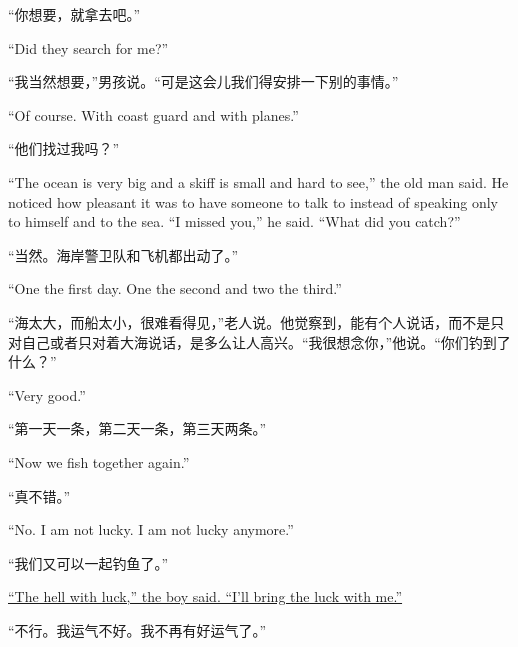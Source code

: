 \begin{paracol}{2}
\switchcolumn

“你想要，就拿去吧。”

\switchcolumn*

``Did they search for me?''

\switchcolumn

“我当然想要，”男孩说。“可是这会儿我们得安排一下别的事情。”

\switchcolumn*

``Of course. With coast guard and with planes.''

\switchcolumn

“他们找过我吗？”

\switchcolumn*

``The ocean is very big and a skiff is small and hard to see,'' the old man
said. He noticed how pleasant it was to have someone to talk to instead of
speaking only to himself and to the sea. ``I missed you,'' he said. ``What
did you catch?''

\switchcolumn

“当然。海岸警卫队和飞机都出动了。”

\switchcolumn*

``One the first day. One the second and two the third.''

\switchcolumn

“海太大，而船太小，很难看得见，”老人说。他觉察到，能有个人说话，而不是只对自己或者只对着大海说话，是多么让人高兴。“我很想念你，”他说。“你们钓到了什么？”

\switchcolumn*

``Very good.''

\switchcolumn

“第一天一条，第二天一条，第三天两条。”

\switchcolumn*

``Now we fish together again.''

\switchcolumn

“真不错。”

\switchcolumn*

``No. I am not lucky. I am not lucky anymore.''

\switchcolumn

“我们又可以一起钓鱼了。”

\switchcolumn*

\uline{``The hell with luck,'' the boy said. ``I'll bring the luck with me.''}

\switchcolumn

“不行。我运气不好。我不再有好运气了。”

\switchcolumn*


\end{paracol}
